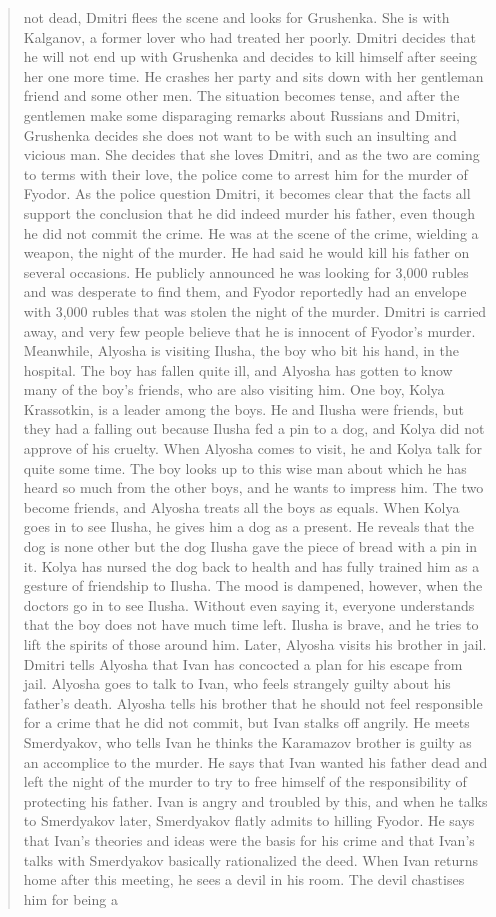 \documentclass{article}
\begin{document}
\begin{quote}
not dead, Dmitri flees the scene and looks for Grushenka. She is with Kalganov, a former lover who had treated her poorly. Dmitri decides that he will not end up with Grushenka and decides to kill himself after seeing her one more time. He crashes her party and sits down with her gentleman friend and some other men. The situation becomes tense, and after the gentlemen make some disparaging remarks about Russians and Dmitri, Grushenka decides she does not want to be with such an insulting and vicious man. She decides that she loves Dmitri, and as the two are coming to terms with their love, the police come to arrest him for the murder of Fyodor. As the police question Dmitri, it becomes clear that the facts all support the conclusion that he did indeed murder his father, even though he did not commit the crime. He was at the scene of the crime, wielding a weapon, the night of the murder. He had said he would kill his father on several occasions. He publicly announced he was looking for 3,000 rubles and was desperate to find them, and Fyodor reportedly had an envelope with 3,000 rubles that was stolen the night of the murder. Dmitri is carried away, and very few people believe that he is innocent of Fyodor's murder. Meanwhile, Alyosha is visiting Ilusha, the boy who bit his hand, in the hospital. The boy has fallen quite ill, and Alyosha has gotten to know many of the boy's friends, who are also visiting him. One boy, Kolya Krassotkin, is a leader among the boys. He and Ilusha were friends, but they had a falling out because Ilusha fed a pin to a dog, and Kolya did not approve of his cruelty. When Alyosha comes to visit, he and Kolya talk for quite some time. The boy looks up to this wise man about which he has heard so much from the other boys, and he wants to impress him. The two become friends, and Alyosha treats all the boys as equals. When Kolya goes in to see Ilusha, he gives him a dog as a present. He reveals that the dog is none other but the dog Ilusha gave the piece of bread with a pin in it. Kolya has nursed the dog back to health and has fully trained him as a gesture of friendship to Ilusha. The mood is dampened, however, when the doctors go in to see Ilusha. Without even saying it, everyone understands that the boy does not have much time left. Ilusha is brave, and he tries to lift the spirits of those around him. Later, Alyosha visits his brother in jail. Dmitri tells Alyosha that Ivan has concocted a plan for his escape from jail. Alyosha goes to talk to Ivan, who feels strangely guilty about his father's death. Alyosha tells his brother that he should not feel responsible for a crime that he did not commit, but Ivan stalks off angrily. He meets Smerdyakov, who tells Ivan he thinks the Karamazov brother is guilty as an accomplice to the murder. He says that Ivan wanted his father dead and left the night of the murder to try to free himself of the responsibility of protecting his father. Ivan is angry and troubled by this, and when he talks to Smerdyakov later, Smerdyakov flatly admits to hilling Fyodor. He says that Ivan's theories and ideas were the basis for his crime and that Ivan's talks with Smerdyakov basically rationalized the deed. When Ivan returns home after this meeting, he sees a devil in his room. The devil chastises him for being a 
\end{quote}
\end{document}

